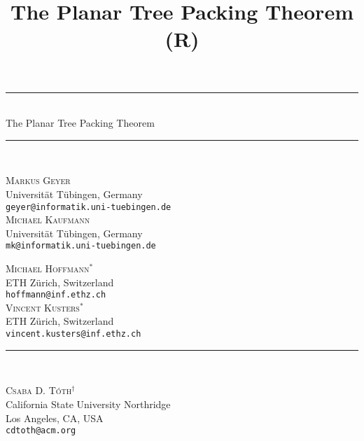 \documentclass[11pt,a4paper,colorlinks=true,urlcolor=blue,citecolor=red]{article}
\title{The Planar Tree Packing Theorem ({R\svnInfoRevision})}
\theoremstyle{plain}
\newcommand{\HRule}{\rule{\linewidth}{0.5mm}}
\begin{document}
\begin{titlepage}
  \begin{center}
    \HRule \\[0.4cm]
    {\huge The Planar Tree Packing Theorem}\\[0cm]
    \HRule \\[1cm]

    \begin{minipage}{0.45\textwidth}
      \begin{center} \large
        \textsc{Markus Geyer}\\
        \small
Universit\"{a}t T\"{u}bingen, Germany\\
        \verb|geyer@informatik.uni-tuebingen.de|\\[0.4cm]
        \large
        \textsc{Michael Kaufmann}\\
        \small
Universit\"{a}t T\"{u}bingen, Germany\\
        \verb|mk@informatik.uni-tuebingen.de|\\[0.4cm]
      \end{center}
    \end{minipage}
    \begin{minipage}{0.45\textwidth}
      \begin{center} \large
        \textsc{Michael Hoffmann$^*$}\\
        \small ETH Z\"{u}rich, Switzerland\\
        \verb|hoffmann@inf.ethz.ch|\\[0.4cm]
        \large
        \textsc{Vincent Kusters$^*$}\\
        \small ETH Z\"{u}rich, Switzerland\\
        \verb|vincent.kusters@inf.ethz.ch|\\[0.4cm]
      \end{center}
    \end{minipage}
    \rule{\linewidth}{0mm} \\[0.6cm]
    \begin{minipage}{0.45\textwidth}
      \begin{center} \large
        \textsc{Csaba D. T\'oth$^{\dag}$}\\
        \small \small California State University Northridge\\ Los
        Angeles, CA, USA\\
        \verb|cdtoth@acm.org|
      \end{center}
    \end{minipage}
  \end{center}


\end{titlepage}
\end{document}
